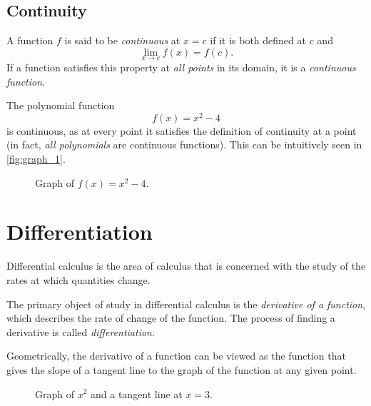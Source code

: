 \documentclass[headings=standardclasses]{scrreprt}
\begin{document}
\section{Continuity}

A function \(f\) is said to be \emph{continuous} at \(x = c\) if it is both
defined at \(c\) and \[ \lim_{x → c} f(x) = f(c). \] If a function satisfies
this property at \emph{all points} in its domain, it is a \emph{continuous
  function}.

\begin{nexample}
  The polynomial function \[ f(x) = x^{2} - 4 \] is continuous, as at every
  point it satisfies the definition of continuity at a point (in fact, \emph{all
    polynomials} are continuous functions). This can be intuitively seen in
  \autoref{fig:graph_1}.

  \begin{figure}[h]
    \centering


    \caption{Graph of \(f(x) = x^{2} - 4\).}\label{fig:graph_1}
  \end{figure}
\end{nexample}

\chapter{Differentiation}

Differential calculus is the area of calculus that is concerned with the study
of the rates at which quantities change.

The primary object of study in differential calculus is the \emph{derivative of
  a function}, which describes the rate of change of the function. The process
of finding a derivative is called \emph{differentiation}.

Geometrically, the derivative of a function can be viewed as the function that
gives the slope of a tangent line to the graph of the function at any given
point.

\begin{figure}[h]
  \centering


  \caption{Graph of \(x^{2}\) and a tangent line at \(x = 3\).}
\end{figure}
\end{document}
